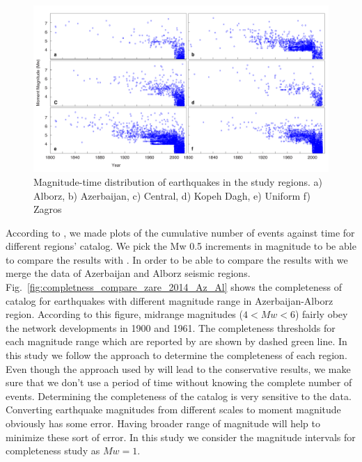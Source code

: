 \begin{figure} [!ht]
\centering
\includegraphics[scale=0.5]{figures/pdf/figure-05.pdf} 
\caption{Magnitude-time distribution of earthquakes in the study regions. a) Alborz, b) Azerbaijan, c) Central, d) Kopeh Dagh, e) Uniform f) Zagros}
\label{fig:completness_scatter}
\end{figure}

 According to   \citet{Frankel1995},  we made plots of the cumulative number of events against time for different regions' catalog. We pick the Mw 0.5 increments in magnitude to be able to compare the results with \citet{Zare2014}. In order to be able to compare the results with \citet{Zare2014} we merge the data of Azerbaijan and Alborz seismic regions.  Fig.~\ref{fig:completness_compare_zare_2014_Az_Al} shows the completeness of catalog for earthquakes with different magnitude range in Azerbaijan-Alborz region. According to this figure, midrange magnitudes ($ 4 < Mw < 6 $) fairly obey the network developments in 1900 and 1961. The completeness thresholds for each magnitude range which are reported by \citet{Zare2014} are shown by dashed green line. In this study we follow the \citet{Frankel1995} approach to determine the completeness of each region. Even though the approach used by \citet{Frankel1995} will lead to the conservative results, we make sure that we don't use a period of time without knowing the complete number of events. Determining the completeness of the catalog is very sensitive to the data. Converting earthquake magnitudes from different scales to moment magnitude obviously has some error. Having broader range of magnitude will help to minimize these sort of error. In this study we consider the magnitude intervals for completeness study as $Mw = 1$. 


